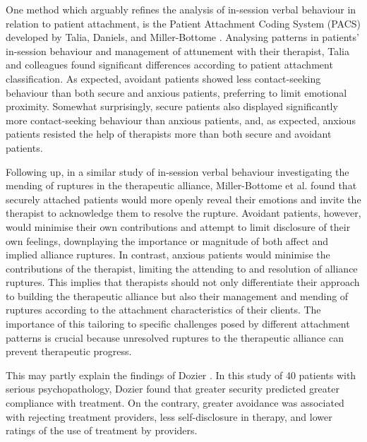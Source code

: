 \documentclass[12pt]{report}
\begin{document}
One method which arguably refines the analysis of in-session verbal behaviour in relation to patient attachment, is the Patient Attachment Coding System (PACS) developed by Talia, Daniels, and Miller-Bottome \cite{Talia2014, Talia2017}.
Analysing patterns in patients' in-session behaviour and management of attunement with their therapist, Talia and colleagues \citeyear{Talia2014} found significant differences according to patient attachment classification.
As expected, avoidant patients showed less contact-seeking behaviour than both secure and anxious patients, preferring to limit emotional proximity.
Somewhat surprisingly, secure patients also displayed significantly more contact-seeking behaviour than anxious patients, and, as expected, anxious patients resisted the help of therapists more than both secure and avoidant patients.

Following up, in a similar study of in-session verbal behaviour investigating the mending of ruptures in the therapeutic alliance, Miller-Bottome et al. \citeyear{MillerBottome2018} found that securely attached patients would more openly reveal their emotions and invite the therapist to acknowledge them to resolve the rupture.
Avoidant patients, however, would minimise their own contributions and attempt to limit disclosure of their own feelings, downplaying the importance or magnitude of both affect and implied alliance ruptures.
In contrast, anxious patients would minimise the contributions of the therapist, limiting the attending to and resolution of alliance ruptures.
This implies that therapists should not only differentiate their approach to building the therapeutic alliance but also their management and mending of ruptures according to the attachment characteristics of their clients. The importance of this tailoring to specific challenges posed by different attachment patterns is crucial because unresolved ruptures to the therapeutic alliance can prevent therapeutic progress.

This may partly explain the findings of Dozier \citeyear{Dozier1990}.
In this study of 40 patients with serious psychopathology, Dozier found that greater security predicted greater compliance with treatment.
On the contrary, greater avoidance was associated with rejecting treatment providers, less self-disclosure in therapy, and lower ratings of the use of treatment by providers.
\end{document}
